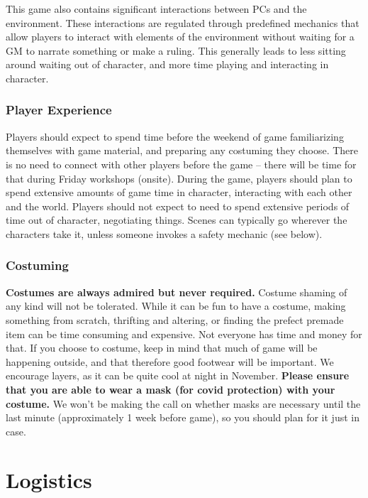 \documentclass[sheet]{GL2020}
\begin{document}
This game also contains significant interactions between PCs and the environment. These interactions are regulated through predefined mechanics that allow players to interact with elements of the environment without waiting for a GM to narrate something or make a ruling. This generally leads to less sitting around waiting out of character, and more time playing and interacting in character. 

\subsubsection{Player Experience}
Players should expect to spend time before the weekend of game familiarizing themselves with game material, and preparing any costuming they choose. There is no need to connect with other players before the game -- there will be time for that during Friday workshops (onsite). During the game, players should plan to spend extensive amounts of game time in character, interacting with each other and the world. Players should not expect to need to spend extensive periods of time out of character, negotiating things. Scenes can typically go wherever the characters take it, unless someone invokes a safety mechanic (see below).

\subsubsection{Costuming} 
\textbf{Costumes are always admired but never required.} Costume shaming of any kind will not be tolerated. While it can be fun to have a costume, making something from scratch, thrifting and altering, or finding the prefect premade item can be time consuming and expensive. Not everyone has time and money for that. If you choose to costume, keep in mind that much of game will be happening outside, and that therefore good footwear will be important. We encourage layers, as it can be quite cool at night in November. \textbf{Please ensure that you are able to wear a mask (for covid protection) with your costume.} We won’t be making the call on whether masks are necessary until the last minute (approximately 1 week before game), so you should plan for it just in case.


\section{Logistics}
\end{document}
